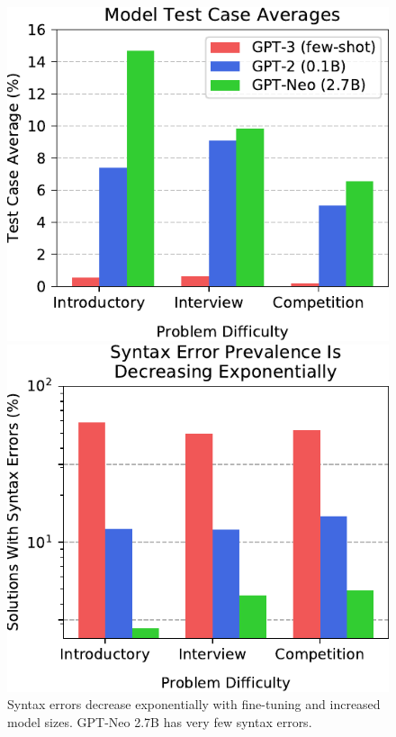 \begin{figure}[t]
\begin{minipage}{.49\textwidth}
\centering
\includegraphics[width=\textwidth]{figures/partial_credit.pdf}
\caption{The average percentage of test cases passed increases with larger fine-tuned models.%
}\label{fig:partial}
\end{minipage}\hfill%
\begin{minipage}{.49\textwidth}
\centering
\includegraphics[width=\textwidth]{figures/syntax_issues.pdf}
\caption{Syntax errors decrease exponentially with fine-tuning and increased model sizes. GPT-Neo 2.7B has very few syntax errors.}\label{fig:syntax}
\end{minipage}
\end{figure}

